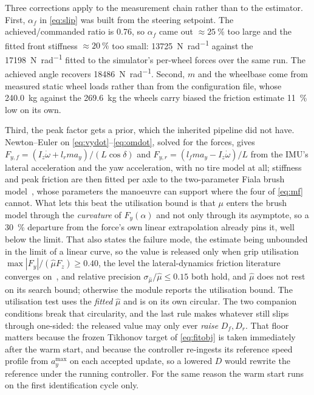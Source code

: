 Three corrections apply to the measurement chain rather than to the estimator.
First, $\alpha_{f}$ in \eqref{eq:slip} was built from the steering setpoint.
The achieved/commanded ratio is \num{0.76}, so $\alpha_{f}$ came out
$\approx\SI{25}{\percent}$ too large and the fitted front stiffness
$\approx\SI{20}{\percent}$ too small: \SI{13725}{\newton\per\radian} against
the \SI{17198}{\newton\per\radian} fitted to the simulator's per-wheel forces
over the same run. The achieved angle recovers
\SI{18486}{\newton\per\radian}. Second, $m$ and the wheelbase come from
measured static wheel loads rather than from the configuration file, whose
\SI{240.0}{\kilo\gram} against the \SI{269.6}{\kilo\gram} the wheels carry
biased the friction estimate \SI{11}{\percent} low on its own.

Third, the peak factor gets a prior, which the inherited pipeline did not have.
Newton--Euler on \eqref{eq:vydot}--\eqref{eq:omdot}, solved for the forces,
gives $F_{y,f}=(I_{z}\dot\omega+l_{r}ma_{y})/(L\cos\delta)$ and
$F_{y,r}=(l_{f}ma_{y}-I_{z}\dot\omega)/L$ from the IMU's lateral acceleration
and the yaw acceleration, with no tire model at all; stiffness and peak
friction are then fitted per axle to the two-parameter Fiala brush
model~\cite{fiala1954}, whose parameters the manoeuvre can support where the
four of \eqref{eq:mf} cannot. What lets this beat the utilisation bound is that
$\mu$ enters the brush model through the \emph{curvature} of $F_{y}(\alpha)$
and not only through its asymptote, so a \SI{30}{\percent} departure from the
force's own linear extrapolation already pins it, well below the limit. That
also states the failure mode, the estimate being unbounded in the limit of a
linear curve, so the value is released only when grip utilisation
$\max|F_{y}|/(\hat\mu F_{z})\ge\num{0.40}$, the level the lateral-dynamics
friction literature converges on~\cite{acosta2017friction}, and relative
precision $\sigma_{\hat\mu}/\hat\mu\le\num{0.15}$ both hold, and $\hat\mu$
does not rest on its search bound; otherwise the module reports the utilisation
bound. The utilisation test uses the \emph{fitted} $\hat\mu$ and is on its own
circular. The two companion conditions break that circularity, and the last
rule makes whatever still slips through one-sided: the released value may only
ever \emph{raise} $D_{f},D_{r}$. That floor matters because the frozen Tikhonov
target of \eqref{eq:fitobj} is taken immediately after the warm start, and
because the controller re-ingests its reference speed profile from
$a_{y}^{\max}$ on each accepted update, so a lowered $D$ would rewrite the
reference under the running controller. For the same reason the warm start runs on the first
identification cycle only.

